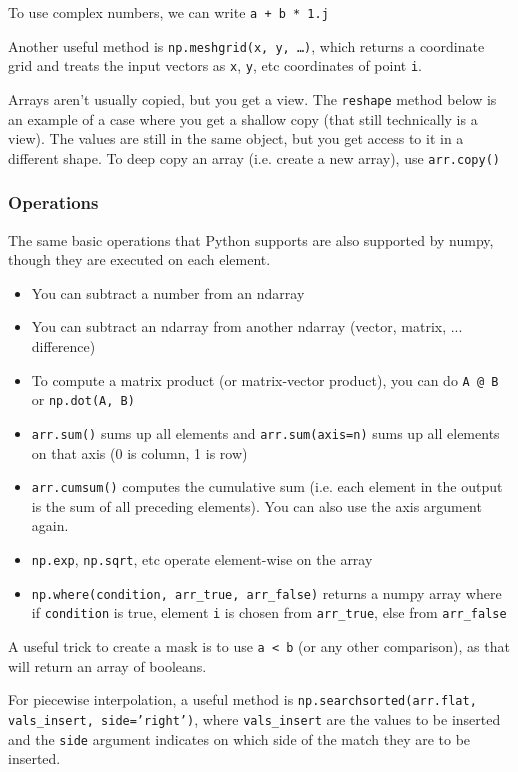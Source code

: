\dnrmvspace
To use complex numbers, we can write \texttt{a + b * 1.j}

Another useful method is \texttt{np.meshgrid(x, y, \dots)}, which returns a coordinate grid
and treats the input vectors as \texttt{x}, \texttt{y}, etc coordinates of point \texttt{i}.

Arrays aren't usually copied, but you get a view. The \texttt{reshape} method below is an example of a case where you get a shallow copy (that still technically is a view).
The values are still in the same object, but you get access to it in a different shape.
To deep copy an array (i.e. create a new array), use \texttt{arr.copy()}


\subsubsection{Operations}
The same basic operations that Python supports are also supported by numpy, though they are executed on each element.

\begin{itemize}[noitemsep]
    \item You can subtract a number from an ndarray
    \item You can subtract an ndarray from another ndarray (vector, matrix, ... difference)
    \item To compute a matrix product (or matrix-vector product), you can do \texttt{A @ B} or \texttt{np.dot(A, B)}
    \item \texttt{arr.sum()} sums up all elements and \texttt{arr.sum(axis=n)} sums up all elements on that axis (0 is column, 1 is row)
    \item \texttt{arr.cumsum()} computes the cumulative sum (i.e. each element in the output is the sum of all preceding elements). You can also use the axis argument again.
    \item \texttt{np.exp}, \texttt{np.sqrt}, etc operate element-wise on the array
    \item \texttt{np.where(condition, arr\_true, arr\_false)} returns a numpy array where if \texttt{condition} is true,
          element \texttt{i} is chosen from \texttt{arr\_true}, else from \texttt{arr\_false}
\end{itemize}
A useful trick to create a mask is to use \texttt{a < b} (or any other comparison), as that will return an array of booleans.

For piecewise interpolation, a useful method is \texttt{np.searchsorted(arr.flat, vals\_insert, side='right')}, where \texttt{vals\_insert} are the values to be inserted
and the \texttt{side} argument indicates on which side of the match they are to be inserted.

